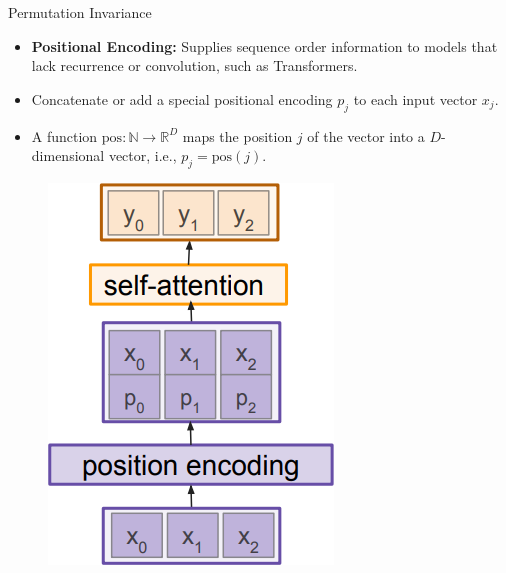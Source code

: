 \begin{frame}[allowframebreaks]{Permutation Invariance}
    \begin{itemize}
        \item \textbf{Positional Encoding:} Supplies sequence order information to models that lack recurrence or convolution, such as Transformers.
        \item Concatenate or add a special positional encoding $p_j$ to each input vector $x_j$.
        \item A function $\mathrm{pos}: \mathbb{N} \rightarrow \mathbb{R}^D$ maps the position $j$ of the vector into a $D$-dimensional vector, i.e., $p_j = \mathrm{pos}(j)$.
    \end{itemize}

    \vspace{1em}

    \begin{figure}
        \centering
        \includegraphics[width=\linewidth,height=0.45\textheight,keepaspectratio]{images/transformers/slide_45_1_img.png}
    \end{figure}


\end{frame}
